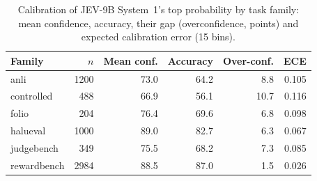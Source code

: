 \begin{table}[t]
\centering\small
\caption{Calibration of JEV-9B System~1's top probability by task family: mean confidence, accuracy, their gap (overconfidence, points) and expected calibration error (15 bins).}
\label{tab:calibration}
\begin{tabular}{@{}lrrrrr@{}}
\toprule
Family & $n$ & Mean conf. & Accuracy & Over-conf. & ECE \\
\midrule
anli & 1200 & 73.0 & 64.2 & 8.8 & 0.105 \\
controlled & 488 & 66.9 & 56.1 & 10.7 & 0.116 \\
folio & 204 & 76.4 & 69.6 & 6.8 & 0.098 \\
halueval & 1000 & 89.0 & 82.7 & 6.3 & 0.067 \\
judgebench & 349 & 75.5 & 68.2 & 7.3 & 0.085 \\
rewardbench & 2984 & 88.5 & 87.0 & 1.5 & 0.026 \\
\bottomrule
\end{tabular}
\end{table}
